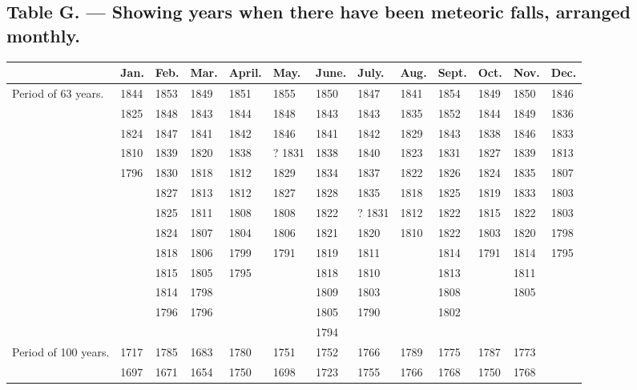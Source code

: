 \documentclass[a4paper, 12pt, oneside]{article}
\begin{document}
\subsection{Table G. --- Showing years when there have been meteoric falls, arranged monthly.}
\begin{table}[!ht]
    \centering
    \bfseries
    \Fontauri
    \footnotesize
    \begin{tabular}{|p{20mm}|l|l|l|l|l|l|l|l|l|l|l|l|}
    \hline
        ~ & Jan. & Feb. & Mar. & April. & May. & June. & July. & Aug. & Sept. & Oct. & Nov. & Dec. \\ \hline
        Period of 63 years. & 1844 & 1853 & 1849 & 1851 & 1855 & 1850 & 1847 & 1841 & 1854 & 1849 & 1850 & 1846 \\
        ~ & 1825 & 1848 & 1843 & 1844 & 1848 & 1843 & 1843 & 1835 & 1852 & 1844 & 1849 & 1836 \\
        ~ & 1824 & 1847 & 1841 & 1842 & 1846 & 1841 & 1842 & 1829 & 1843 & 1838 & 1846 & 1833 \\
        ~ & 1810 & 1839 & 1820 & 1838 & ? 1831 & 1838 & 1840 & 1823 & 1831 & 1827 & 1839 & 1813 \\
        ~ & 1796 & 1830 & 1818 & 1812 & 1829 & 1834 & 1837 & 1822 & 1826 & 1824 & 1835 & 1807 \\
        ~ & ~ & 1827 & 1813 & 1812 & 1827 & 1828 & 1835 & 1818 & 1825 & 1819 & 1833 & 1803 \\
        ~ & ~ & 1825 & 1811 & 1808 & 1808 & 1822 & ? 1831 & 1812 & 1822 & 1815 & 1822 & 1803 \\
        ~ & ~ & 1824 & 1807 & 1804 & 1806 & 1821 & 1820 & 1810 & 1822 & 1803 & 1820 & 1798 \\
        ~ & ~ & 1818 & 1806 & 1799 & 1791 & 1819 & 1811 & ~ & 1814 & 1791 & 1814 & 1795 \\
        ~ & ~ & 1815 & 1805 & 1795 & ~ & 1818 & 1810 & ~ & 1813 & ~ & 1811 & ~ \\
        ~ & ~ & 1814 & 1798 & ~ & ~ & 1809 & 1803 & ~ & 1808 & ~ & 1805 & ~ \\
        ~ & ~ & 1796 & 1796 & ~ & ~ & 1805 & 1790 & ~ & 1802 & ~ & ~ & ~ \\
        ~ & ~ & ~ & ~ & ~ & ~ & 1794 & ~ & ~ & ~ & ~ & ~ & ~ \\ \hline
        Period of 100 years. & 1717 & 1785 & 1683 & 1780 & 1751 & 1752 & 1766 & 1789 & 1775 & 1787 & 1773 & ~ \\
        ~ & 1697 & 1671 & 1654 & 1750 & 1698 & 1723 & 1755 & 1766 & 1768 & 1750 & 1768 & ~ \\

\end{tabular}
\end{table}
\end{document}
